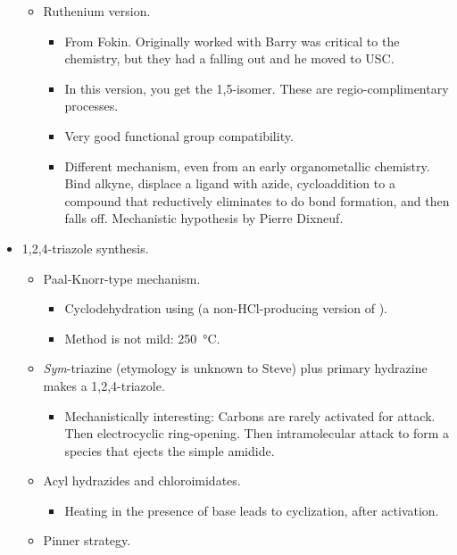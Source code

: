 \documentclass[../notes.tex]{subfiles}
\begin{document}
\begin{itemize}
\begin{itemize}
\begin{itemize}
        \end{itemize}
        \item Ruthenium version.
        \begin{itemize}
            \item From Fokin. Originally worked with Barry was critical to the chemistry, but they had a falling out and he moved to USC.
            \item In this version, you get the 1,5-isomer. These are regio-complimentary processes.
            \item Very good functional group compatibility.
            \item Different mechanism, even from an early organometallic chemistry. Bind alkyne, displace a ligand with azide, cycloaddition to a compound that reductively eliminates to do  bond formation, and then falls off. Mechanistic hypothesis by Pierre Dixneuf.
        \end{itemize}
    \end{itemize}
    \item 1,2,4-triazole synthesis.
    \begin{itemize}
        \item Paal-Knorr-type mechanism.
        \begin{itemize}
            \item Cyclodehydration using  (a non-HCl-producing version of ).
            \item Method is not mild: \SI{250}{\celsius}.
        \end{itemize}
        \item \emph{Sym}-triazine (etymology is unknown to Steve) plus primary hydrazine makes a 1,2,4-triazole.
        \begin{itemize}
            \item Mechanistically interesting: Carbons are rarely activated for attack. Then electrocyclic ring-opening. Then intramolecular attack to form a species that ejects the simple amidide.
        \end{itemize}
        \item Acyl hydrazides and chloroimidates.
        \begin{itemize}
            \item Heating in the presence of base leads to cyclization, after activation.
        \end{itemize}
        \item Pinner strategy.
        \begin{itemize}

\end{itemize}
\end{itemize}
\end{itemize}
\end{document}
